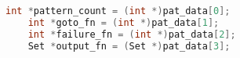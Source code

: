 \begin{lstlisting}[language=C,caption={C unpacking of pattern data (Aho-Corasick)},label={lst:c_unpack}]
    int *pattern_count = (int *)pat_data[0];
    int *goto_fn = (int *)pat_data[1];
    int *failure_fn = (int *)pat_data[2];
    Set *output_fn = (Set *)pat_data[3];
\end{lstlisting}

